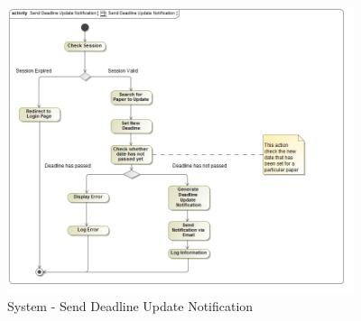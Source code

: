 \documentclass{article}
\begin{document}
			\begin{figure}[H]
				\includegraphics[width=4in, center]{../Diagrams/Process Specifications/Send Deadline Update Notification.jpg}
				\caption{System - Send Deadline Update Notification}
			\end{figure}
\end{document}
